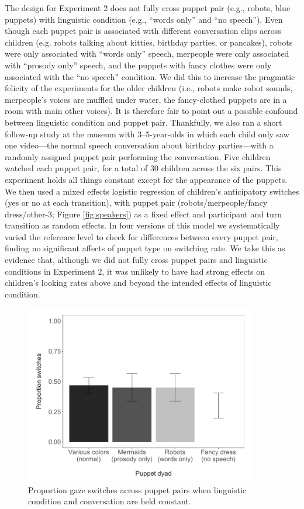 \documentclass[authoryear, 12pt]{elsarticle}
\begin{document}
\bigskip

The design for Experiment 2 does not fully cross puppet pair (e.g., robots, blue puppets) with linguistic condition (e.g., ``words only'' and ``no speech''). Even though each puppet pair is associated with different conversation clips across children (e.g. robots talking about kitties, birthday parties, or pancakes), robots were only associated with ``words only'' speech, merpeople were only associated with ``prosody only'' speech, and the puppets with fancy clothes were only associated with the ``no speech'' condition. We did this to increase the pragmatic felicity of the experiments for the older children (i.e., robots make robot sounds, merpeople's voices are muffled under water, the fancy-clothed puppets are in a room with main other voices). It is therefore fair to point out a possible confound between linguistic condition and puppet pair. Thankfully, we also ran a short follow-up study at the museum with 3--5-year-olds in which each child only saw one video---the normal speech conversation about birthday parties---with a randomly assigned puppet pair performing the conversation. Five children watched each puppet pair, for a total of 30 children across the six pairs. This experiment holds all things constant except for the appearance of the puppets. We then used a mixed effects logistic regression of children's anticipatory switches (yes or no at each transition), with puppet pair (robots/merpeople/fancy dress/other-3; Figure \ref{fig:speakers}) as a fixed effect and participant and turn transition as random effects. In four versions of this model we systematically varied the reference level to check for differences between every puppet pair, finding no significant affects of puppet type on switching rate. We take this as evidence that, although we did not fully cross puppet pairs and linguistic conditions in Experiment 2, it was unlikely to have had strong effects on children's looking rates above and beyond the intended effects of linguistic condition.

\begin{figure}[!htb]
\begin{center}
\includegraphics[width=0.9\textwidth]{figures/all-puppetdyads-bars.png}
\end{center}
\caption{Proportion gaze switches across puppet pairs when linguistic condition and conversation are held constant.} 
\label{fig:pairconfound}
\end{figure}
\end{document}
